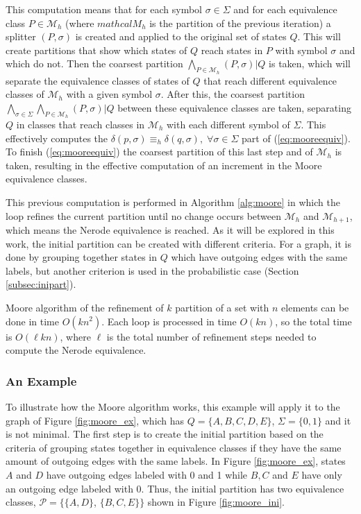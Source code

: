 {\noindent This computation means that for each symbol $\sigma\in\Sigma$ and for each equivalence class $P\in\mathcal{M}_h$ (where $mathcal{M}_h$ is the partition of the previous iteration) a splitter $(P,\sigma)$ is created and applied to the original set of states $Q$. This will create partitions that show which states of $Q$ reach states in $P$ with symbol $\sigma$ and which do not. Then the coarsest partition $\bigwedge_{P\in\mathcal{M}_h}(P,\sigma)|Q$ is taken, which will separate the equivalence classes of states of $Q$ that reach different equivalence classes of $\mathcal{M}_h$ with a given symbol $\sigma$. After this, the coarsest partition $\bigwedge_{\sigma\in\Sigma} \bigwedge_{P\in\mathcal{M}_h}(P,\sigma)|Q$ between these equivalence classes are taken, separating $Q$ in classes that reach classes in $\mathcal{M}_h$ with each different symbol of $\Sigma$. This effectively computes the $\delta(p,\sigma) \equiv_h \delta(q,\sigma), \; \forall \sigma \in \Sigma$ part of (\ref{eq:mooreequiv}). To finish (\ref{eq:mooreequiv}) the coarsest partition of this last step and of $\mathcal{M}_h$ is taken, resulting in the effective computation of an increment in the Moore equivalence classes.

 This previous computation is performed in Algorithm \ref{alg:moore} in which the loop refines the current partition until no change occurs between $\mathcal{M}_h$ and $\mathcal{M}_{h+1}$, which means the Nerode equivalence is reached. As it will be explored in this work, the initial partition can be created with different criteria. For a graph, it is done by grouping together states in $Q$ which have outgoing edges with the same labels, but another criterion is used in the probabilistic case (Section \ref{subsec:inipart}).

Moore algorithm of the refinement of $k$ partition of a set with $n$ elements can be done in time $O(kn^2)$. Each loop is processed in time $O(kn)$, so the total time is $O(\ell kn)$, where $\ell$ is the total number of refinement steps needed to compute the Nerode equivalence.

\subsubsection{An Example}

To illustrate how the Moore algorithm works, this example will apply it to the graph of Figure \ref{fig:moore_ex}, which has $Q = \{A, B, C, D, E\}$, $\Sigma = \{0, 1\}$ and it is not minimal. The first step is to create the initial partition based on the criteria of grouping states together in equivalence classes if they have the same amount of outgoing edges with the same labels. In Figure \ref{fig:moore_ex}, states $A$ and $D$ have outgoing edges labeled with 0 and 1 while $B, C$ and $E$ have only an outgoing edge labeled with 0. Thus, the initial partition has two equivalence classes, $\mathcal{P} = \{\{A,D\}$,  $\{B,C,E\}\}$ shown in Figure \ref{fig:moore_ini}.

}
